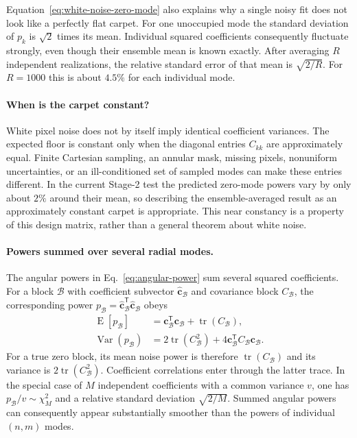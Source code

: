 \documentclass[aps,prb,preprint,onecolumn,notitlepage,amsmath,amssymb,
  superscriptaddress,floatfix]{revtex4-2}
\newcommand{\trans}{\mathsf{T}}
\newcommand{\tr}{\operatorname{tr}}
\begin{document}
Equation~\eqref{eq:white-noise-zero-mode} also explains why a single noisy
fit does not look like a perfectly flat carpet.  For one unoccupied mode the
standard deviation of $p_k$ is $\sqrt{2}$ times its mean.  Individual squared
coefficients consequently fluctuate strongly, even though their ensemble
mean is known exactly.  After averaging $R$ independent realizations, the
relative standard error of that mean is $\sqrt{2/R}$.  For $R=1000$ this is
about $4.5\%$ for each individual mode.

\paragraph{When is the carpet constant?}
White pixel noise does not by itself imply identical coefficient variances.
The expected floor is constant only when the diagonal entries $C_{kk}$ are
approximately equal.  Finite Cartesian sampling, an annular mask, missing
pixels, nonuniform uncertainties, or an ill-conditioned set of sampled modes
can make these entries different.  In the current Stage-2 test the predicted
zero-mode powers vary by only about $2\%$ around their mean, so describing the
ensemble-averaged result as an approximately constant carpet is appropriate.
This near constancy is a property of this design matrix, rather than a general
theorem about white noise.

\paragraph{Powers summed over several radial modes.}
The angular powers in Eq.~\eqref{eq:angular-power} sum several squared
coefficients.  For a block $\mathcal{B}$ with coefficient subvector
$\widehat{\bm c}_{\mathcal{B}}$ and covariance block $C_{\mathcal{B}}$, the
corresponding power
$p_{\mathcal{B}}=\widehat{\bm c}_{\mathcal{B}}^{\trans}
\widehat{\bm c}_{\mathcal{B}}$ obeys
\begin{align}
 \operatorname{E}[p_{\mathcal{B}}]
 &=\bm c_{\mathcal{B}}^{\trans}\bm c_{\mathcal{B}}
   +\tr(C_{\mathcal{B}}),
 \label{eq:white-noise-block-mean}\\
 \operatorname{Var}(p_{\mathcal{B}})
 &=2\tr(C_{\mathcal{B}}^2)
   +4\bm c_{\mathcal{B}}^{\trans}C_{\mathcal{B}}\bm c_{\mathcal{B}}.
 \label{eq:white-noise-block-variance}
\end{align}
For a true zero block, its mean noise power is therefore
$\tr(C_{\mathcal{B}})$ and its variance is
$2\tr(C_{\mathcal{B}}^2)$.  Coefficient correlations enter through the
latter trace.  In the special case of $M$ independent coefficients with a
common variance $v$, one has
$p_{\mathcal{B}}/v\sim\chi_M^2$ and a relative standard deviation
$\sqrt{2/M}$.  Summed angular powers can consequently appear substantially
smoother than the powers of individual $(n,m)$ modes.
\end{document}
